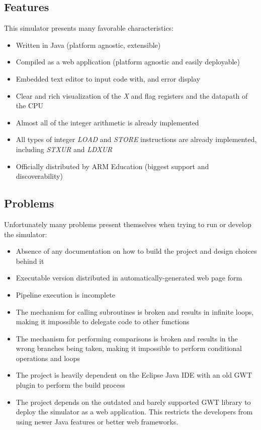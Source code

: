 \subsection*{Features}

This simulator presents many favorable characteristics:

\begin{itemize}[label=\textendash]
	\item Written in Java (platform agnostic, extensible)
	\item Compiled as a web application (platform agnostic and easily deployable)
	\item Embedded text editor to input code with, and error display
	\item Clear and rich visualization of the \emph{X} and flag registers and the datapath of the CPU
	\item Almost all of the integer arithmetic is already implemented
	\item All types of integer \emph{LOAD} and \emph{STORE} instructions are already implemented, including \emph{STXUR} and \emph{LDXUR}
	\item Officially distributed by ARM Education (biggest support and discoverability)
\end{itemize}


\subsection*{Problems}

Unfortunately many problems present themselves when trying to run or develop the simulator:

\begin{itemize}[label=\textendash]
	\item Absence of any documentation on how to build the project and design choices behind it
	\item Executable version distributed in automatically-generated web page form
	\item Pipeline execution is incomplete
	\item The mechanism for calling subroutines is broken and results in infinite loops, making it impossible to delegate code to other functions
	\item The mechanism for performing comparisons is broken and results in the wrong branches being taken, making it impossible to perform conditional operations and loops
	\item The project is heavily dependent on the Eclipse Java IDE with an old GWT plugin to perform the build process
	\item The project depends on the outdated and barely supported GWT library to deploy the simulator as a web application. This restricts the developers from using newer Java features or better web frameworks.
\end{itemize}


